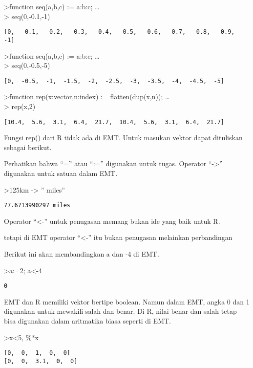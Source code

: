 \documentclass[
]{book}
\begin{document}
\textgreater function seq(a,b,c) := a:b:c; \ldots{}\\
\textgreater{} seq(0,-0.1,-1)

\begin{verbatim}
[0,  -0.1,  -0.2,  -0.3,  -0.4,  -0.5,  -0.6,  -0.7,  -0.8,  -0.9,  -1]
\end{verbatim}

\textgreater function seq(a,b,c) := a:b:c; \ldots{}\\
\textgreater{} seq(0,-0.5,-5)

\begin{verbatim}
[0,  -0.5,  -1,  -1.5,  -2,  -2.5,  -3,  -3.5,  -4,  -4.5,  -5]
\end{verbatim}

\textgreater function rep(x:vector,n:index) := flatten(dup(x,n)); \ldots{}\\
\textgreater{} rep(x,2)

\begin{verbatim}
[10.4,  5.6,  3.1,  6.4,  21.7,  10.4,  5.6,  3.1,  6.4,  21.7]
\end{verbatim}

Fungsi rep() dari R tidak ada di EMT. Untuk masukan vektor dapat dituliskan sebagai berikut.

Perhatikan bahwa ``='' atau ``:='' digunakan untuk tugas. Operator ``-\textgreater{}'' digunakan untuk satuan dalam EMT.

\textgreater125km -\textgreater{} '' miles''

\begin{verbatim}
77.6713990297 miles
\end{verbatim}

Operator ``\textless-'' untuk penugasan memang bukan ide yang baik untuk R.

tetapi di EMT operator ``\textless-'' itu bukan penugasan melainkan perbandingan

Berikut ini akan membandingkan a dan -4 di EMT.

\textgreater a:=2; a\textless-4

\begin{verbatim}
0
\end{verbatim}

EMT dan R memiliki vektor bertipe boolean. Namun dalam EMT, angka 0 dan 1 digunakan untuk mewakili salah dan benar. Di R, nilai benar dan salah tetap bisa digunakan dalam aritmatika biasa seperti di EMT.

\textgreater x\textless5, \%*x

\begin{verbatim}
[0,  0,  1,  0,  0]
[0,  0,  3.1,  0,  0]
\end{verbatim}
\end{document}
